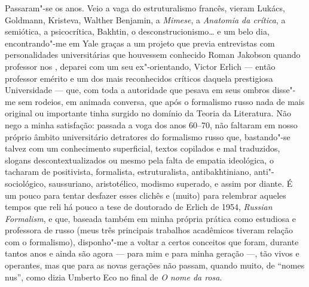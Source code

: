 Passaram"-se os anos. Veio a vaga do estruturalismo francês, vieram
Lukács, Goldmann, Kristeva, Walther Benjamin, a \emph{Mimese}, a
\emph{Anatomia da crítica}, a semiótica, a psicocrítica, Bakhtin, o
desconstrucionismo\ldots{} e um belo dia, encontrando"-me em Yale graças a um
projeto que previa
entrevistas com personalidades universitárias que houvessem conhecido
Roman Jakobson quando professor nos , deparei com um seu
ex"-orientando, Victor Erlich --- então professor emérito e um dos mais
reconhecidos críticos daquela prestigiosa Universidade --- que, com toda
a autoridade que pesava em seus ombros disse"-me sem rodeios, em animada
conversa, que após o formalismo russo nada de mais
original ou importante tinha surgido no domínio da Teoria da Literatura.
Não nego a minha satisfação: passada a voga dos anos 60--70, não faltaram
em nosso próprio âmbito universitário detratores do formalismo russo
que, bastando"-se talvez com um conhecimento superficial, textos
copilados e mal traduzidos, slogans descontextualizados ou mesmo pela
falta de empatia ideológica, o tacharam de positivista, formalista,
estruturalista, antibakhtiniano, anti"-sociológico, saussuriano,
aristotélico, modismo superado, e assim por diante. É um pouco para
tentar desfazer esses clichês e (muito) para relembrar aqueles tempos
que reli há pouco a tese de doutorado de Erlich de 1954, \emph{Russian
Formalism}, e que, baseada também em minha própria prática como
estudiosa e professora de russo (meus três principais trabalhos
acadêmicos tiveram relação com o formalismo), disponho"-me a voltar a certos conceitos que foram, durante
tantos anos e ainda são agora --- para mim e para minha geração ---, tão
vivos e operantes, mas que para as novas gerações não passam, quando
muito, de ``nomes nus'', como dizia Umberto Eco no final de \emph{O nome
da rosa}.

